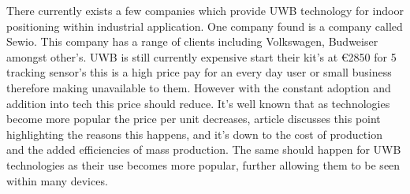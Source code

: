 There currently exists a few companies which provide UWB technology for indoor positioning within industrial application. One company found is a company called Sewio. This company has a range of clients including Volkswagen, Budweiser amongst other’s. UWB is still currently expensive \cite{sewio_2021_realtime} start their kit's at €2850 for 5 tracking sensor's this is a high price pay for an every day user or small business therefore making unavailable to them. However with the constant adoption and addition into tech this price should reduce. It's well known that as technologies become more popular the price per unit decreases, \cite{tuovila_2021_marginal} article discusses this point highlighting the reasons this happens, and it's down to the cost of production and the added efficiencies of mass production. The same should happen for UWB technologies as their use becomes more popular, further allowing them to be seen within many devices. 


